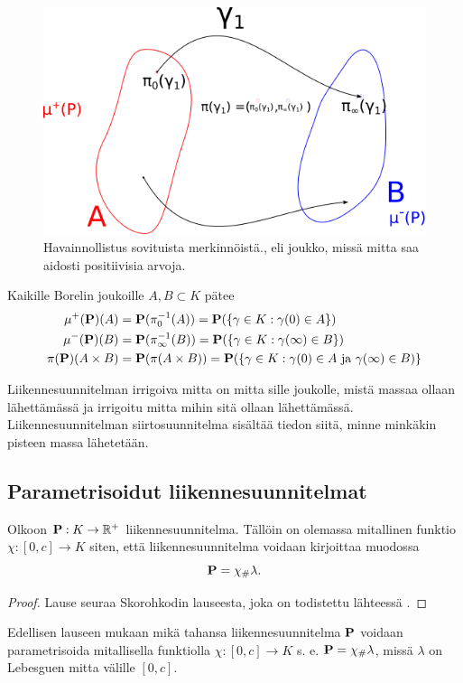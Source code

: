 \begin{figure}
    \centering
    \includegraphics[scale=0.8]{graphics/irrigoiva-ja-irrigoitu-mitta.png}
    \caption{Havainnollistus sovituista merkinnöistä., eli joukko, missä mitta saa aidosti positiivisia arvoja.}
    \label{fig:my_label}
\end{figure}


\begin{remark}
    Kaikille Borelin joukoille $A, B \subset K$ pätee
    \begin{align*}
        \mu^+(\P)(A) &= \P(\pi_0^{-1}(A)) = \P(\{\gamma \in K : \gamma(0) \in A\}) \\
        \mu^-(\P)(B) &= \P(\pi_\infty^{-1}(B)) = \P(\{\gamma \in K : \gamma(\infty) \in B\}) \\
        \pi(\P)(A\times B) &= \P(\pi(A\times B)) = \P(\{\gamma \in K: \gamma(0) \in A\text{ ja } \gamma(\infty) \in B)\}
    \end{align*}
\end{remark}

Liikennesuunnitelman irrigoiva mitta on mitta sille joukolle, mistä massaa ollaan lähettämässä ja irrigoitu mitta mihin sitä ollaan lähettämässä. Liikennesuunnitelman siirtosuunnitelma sisältää tiedon siitä, minne minkäkin pisteen massa lähetetään.

\subsection{Parametrisoidut liikennesuunnitelmat}
 
\begin{theorem}\label{thm:skorohkod}
    Olkoon $\P: K \to \R^+$ liikennesuunnitelma. Tällöin on olemassa mitallinen funktio $\chi: [0, c] \to K$ siten, että liikennesuunnitelma voidaan kirjoittaa muodossa $$\P =\chi_\# \lambda.$$
\end{theorem}
\begin{proof}
    Lause seuraa Skorohkodin lauseesta, joka on todistettu lähteessä \cite[p. 185]{OptimalTransportationNetworks}.
\end{proof}
Edellisen lauseen mukaan mikä tahansa liikennesuunnitelma $\P$ voidaan parametrisoida mitallisella funktiolla $ \chi: [0, c] \to K$ s. e. $\P = \chi_\# \lambda$, missä $\lambda$ on Lebesguen mitta välille $[0,c]$. 

